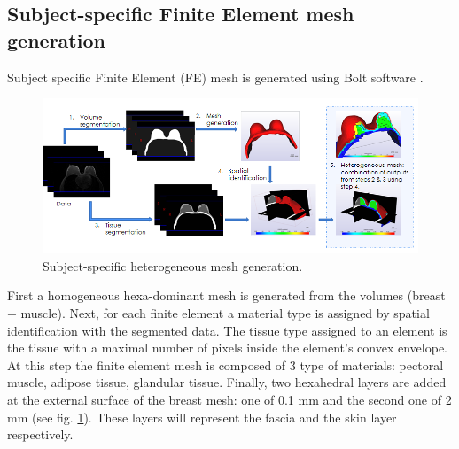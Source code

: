 \subsection{Subject-specific Finite Element mesh generation}
Subject specific Finite Element (FE) mesh is generated using Bolt software \cite{bolt}.

\begin{center}			  
\begin{figure}[h]
\centerline{\includegraphics[width=\textwidth,height=\textheight,keepaspectratio]{figures/FEMesh.png} }
\caption{Subject-specific heterogeneous mesh generation.}
\label{femesh}
\end{figure}
\end{center}

 First a homogeneous hexa-dominant mesh is generated from the volumes (breast + muscle). Next, for each finite element a material type is assigned by spatial identification with the segmented data. The tissue type assigned to an element is the tissue with a maximal number of pixels inside the element's convex envelope. At this step the finite element mesh is composed of 3 type of materials: pectoral muscle, adipose tissue, glandular tissue. Finally, two hexahedral layers are added at the external surface of the breast mesh: one of 0.1 mm and the second one of 2 mm (see fig. \ref{femesh}). These layers will represent the fascia and the skin layer respectively.



